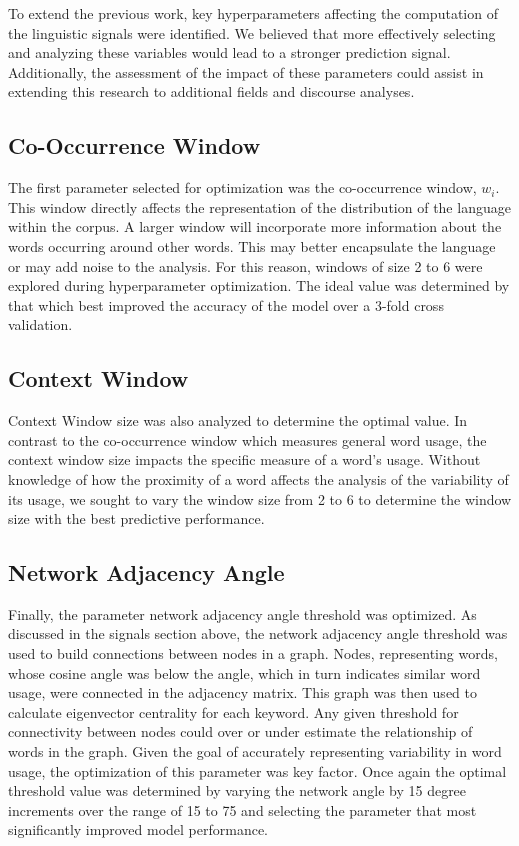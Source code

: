 \documentclass[11pt]{article}
\begin{document}
To extend the previous work, key hyperparameters affecting the computation of the linguistic signals were identified. We believed that more effectively selecting and analyzing these variables would lead to a stronger prediction signal. Additionally, the assessment of the impact of these parameters could assist in extending this research to additional fields and discourse analyses.

\subsection{Co-Occurrence Window}
\label{cooc window}

The first parameter selected for optimization was the co-occurrence window, $w_i$. This window directly affects the representation of the distribution of the language within the corpus. A larger window will incorporate more information about the words occurring around other words. This may better encapsulate the language or may add noise to the analysis. For this reason, windows of size 2 to 6 were explored during hyperparameter optimization. The ideal value was determined by that which best improved the accuracy of the model over a 3-fold cross validation.

\subsection{Context Window}
\label{sect:context window}

Context Window size was also analyzed to determine the optimal value. In contrast to the co-occurrence window which measures general word usage, the context window size impacts the specific measure of a word’s usage. Without knowledge of how the proximity of a word affects the analysis of the variability of its usage, we sought to vary the window size from 2 to 6 to determine the window size with the best predictive performance.

\subsection{Network Adjacency Angle}
\label{sect:angle}

Finally, the parameter network adjacency angle threshold was optimized. As discussed in the signals section above, the network adjacency angle threshold was used to build connections between nodes in a graph. Nodes, representing words, whose cosine angle was below the angle, which in turn indicates similar word usage, were connected in the adjacency matrix. This graph was then used to calculate eigenvector centrality for each keyword. Any given threshold for connectivity between nodes could over or under estimate the relationship of words in the graph. Given the goal of accurately representing variability in word usage, the optimization of this parameter was  key factor. Once again the optimal threshold value was determined by varying the network angle by 15 degree increments over the range of 15 to 75 and selecting the parameter that most significantly improved model performance.
\end{document}
